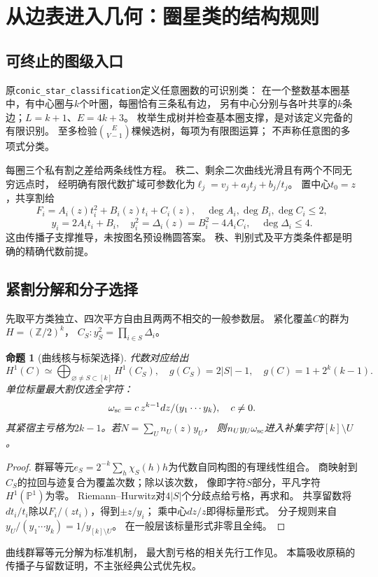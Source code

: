 \documentclass[11pt,a4paper]{ctexart}
\theoremstyle{cnplain}\newtheorem{theorem}{定理}[section]
\newtheorem{proposition}[theorem]{命题}
\theoremstyle{definition}\newtheorem{definition}[theorem]{定义}
\theoremstyle{remark}\newtheorem{remark}[theorem]{注}
\begin{document}
\section{从边表进入几何：圈星类的结构规则}
\subsection{可终止的图级入口}
原\nolinkurl{conic_star_classification}定义任意圈数的可识别类：
在一个整数基本圈基中，有中心圈与$k$个叶圈，每圈恰有三条私有边，
另有中心分别与各叶共享的$k$条边；$L=k+1$、$E=4k+3$。
枚举生成树并检查基本圈支撑，是对该定义完备的有限识别。
至多检验$\binom{E}{V-1}$棵候选树，每项为有限图运算；
不声称任意图的多项式分类。

每圈三个私有割之差给两条线性方程。
秩二、剩余二次曲线光滑且有两个不同无穷远点时，
经明确有限代数扩域可参数化为$\ell_j=v_j+a_jt_j+b_j/t_j$。
置中心$t_0=z$，共享割给
\[
 F_i=A_i(z)t_i^2+B_i(z)t_i+C_i(z),\quad
 \deg A_i,\deg B_i,\deg C_i\leq2,
\]
\[
 y_i=2A_it_i+B_i,\quad y_i^2=\Delta_i(z)=B_i^2-4A_iC_i,\quad
 \deg\Delta_i\leq4.
\]
这由传播子支撑推导，未按图名预设椭圆答案。
秩、判别式及平方类条件都是明确的精确代数前提。

\subsection{紧割分解和分子选择}
先取平方类独立、四次平方自由且两两不相交的一般参数层。
紧化覆盖$C$的群为$H=(\mathbb Z/2)^k$，
$C_S:y_S^2=\prod_{i\in S}\Delta_i$。

\begin{proposition}[曲线核与标架选择]\label{prop:star}
代数对应给出
\[
 H^1(C)\simeq\bigoplus_{\varnothing\ne S\subset[k]}H^1(C_S),
 \quad g(C_S)=2|S|-1,\quad g(C)=1+2^k(k-1).
\]
单位标量最大割仅选全字符：
\[
 \omega_{\rm sc}=c\,z^{k-1}dz/(y_1\cdots y_k),\quad c\ne0.
\]
其紧宿主亏格为$2k-1$。若$N=\sum_U n_U(z)y_U$，
则$n_Uy_U\omega_{\rm sc}$进入补集字符$[k]\setminus U$。
\end{proposition}
\begin{proof}
群幂等元$e_S=2^{-k}\sum_h\chi_S(h)h$为代数自同构图的有理线性组合。
商映射到$C_S$的拉回与迹复合为覆盖次数；除以该次数，
像即字符$S$部分，平凡字符$H^1(\mathbb P^1)$为零。
Riemann--Hurwitz对$4|S|$个分歧点给亏格，再求和。
共享留数将$dt_i/t_i$除以$F_i/(zt_i)$，得到$\pm z/y_i$；
乘中心$dz/z$即得标量形式。
分子规则来自$y_U/(y_1\cdots y_k)=1/y_{[k]\setminus U}$。
在一般层该标量形式非零且全纯。
\end{proof}
曲线群幂等元分解为标准机制\cite{KR}，
最大割亏格的相关先行工作见\cite{HHMZ}。
本篇吸收原稿的传播子与留数证明，不主张经典公式优先权。
\end{document}

